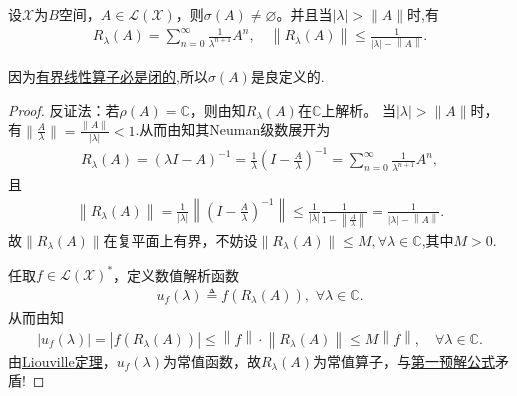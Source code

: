 \documentclass[../../main.tex]{subfiles}%
\begin{document}
\begin{theorem}\label{theorem:谱集非空定理}
设$\mathscr{X}$为$B$空间，$A\in \mathscr{L}(\mathscr{X})$，则$\sigma(A)\neq\varnothing $。并且当$|\lambda|>\|A\|$时,有
\begin{align}\label{eq:resolvent_series}
R_{\lambda}(A)=\sum_{n=0}^{\infty}{\frac{1}{\lambda ^{n+1}}A^n},\quad \left\| R_{\lambda}\left( A \right) \right\|\leqslant \frac{1}{\left| \lambda \right|-\left\| A \right\|}.
\end{align}
\end{theorem}
\begin{remark}
因为\hyperref[proposition:有界线性算子必是闭的]{有界线性算子必是闭的},所以$\sigma(A)$是良定义的.
\end{remark}
\begin{proof}

反证法：若$\rho(A)=\mathbb{C}$，则由知$R_{\lambda}(A)$在$\mathbb{C}$上解析。
当$|\lambda|>\|A\|$时，有$\|\frac{A}{\lambda}\|=\frac{\|A\|}{|\lambda|}<1$.从而由知其Neuman级数展开为
\begin{align*}
R_{\lambda}(A)=\left( \lambda I-A \right) ^{-1}=\frac{1}{\lambda} \left( I-\frac{A}{\lambda} \right) ^{-1}=\sum_{n=0}^{\infty}{\frac{1}{\lambda ^{n+1}}A^n},
\end{align*}
且
\begin{align*}
\left\| R_{\lambda}\left( A \right) \right\| =\frac{1}{\left| \lambda \right|}\left\| \left( I-\frac{A}{\lambda} \right) ^{-1} \right\| \leqslant \frac{1}{\left| \lambda \right|}\frac{1}{1-\left\| \frac{A}{\lambda} \right\|}=\frac{1}{\left| \lambda \right|-\left\| A \right\|}.
\end{align*}
故$\|R_{\lambda}(A)\|$在复平面上有界，不妨设$\|R_{\lambda}(A)\|\leqslant M,\forall \lambda \in \mathbb{C}$,其中$M>0$.

任取$f\in\mathscr{L}(\mathscr{X})^*$，定义数值解析函数
\begin{align*}
u_f(\lambda)\triangleq f(R_{\lambda}(A)),\,\,\forall \lambda \in \mathbb{C}.
\end{align*}
从而由知
\begin{align*}
\left| u_f\left( \lambda \right) \right|=\left| f\left( R_{\lambda}\left( A \right) \right) \right|\leqslant \left\| f \right\| \cdot \left\| R_{\lambda}\left( A \right) \right\| \leqslant M\left\| f \right\| ,\quad \forall \lambda \in \mathbb{C} .
\end{align*}
由\hyperref[Complex-Analysis-theorem:Liouville(刘维尔)定理]{Liouville定理}，$u_f(\lambda)$为常值函数，故$R_{\lambda}(A)$为常值算子，与\hyperref[lemma:第一预解公式]{第一预解公式}矛盾!

\end{proof}
\end{document}
